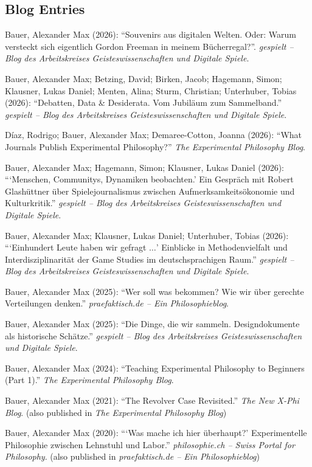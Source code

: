 \documentclass[a4paper,10pt]{article}
\newenvironment{literature}{%
   \parskip6pt\parindent0pt\raggedright
   \def\lititem{\hangindent=1cm\hangafter1}}{%
   \par\ignorespaces}
\begin{document}
\subsection*{Blog Entries}
\begin{literature}
\lititem Bauer, Alexander Max (2026): \enquote{Souvenirs aus digitalen Welten. Oder: Warum versteckt sich eigentlich Gordon Freeman in meinem Bücherregal?}. \textit{gespielt -- Blog des Arbeitskreises Geisteswissenschaften und Digitale Spiele}.

\lititem Bauer, Alexander Max; Betzing, David; Birken, Jacob; Hagemann, Simon; Klausner, Lukas Daniel; Menten, Alina; Sturm, Christian; Unterhuber, Tobias (2026): \enquote{Debatten, Data \& Desiderata. Vom Jubiläum zum Sammelband.} \textit{gespielt -- Blog des Arbeitskreises Geisteswissenschaften und Digitale Spiele}.

\lititem Díaz, Rodrigo; Bauer, Alexander Max; Demaree-Cotton, Joanna (2026): \enquote{What Journals Publish Experimental Philosophy?} \textit{The Experimental Philosophy Blog}.

\lititem Bauer, Alexander Max; Hagemann, Simon; Klausner, Lukas Daniel (2026): \enquote{\enquote{Menschen, Communitys, Dynamiken beobachten.} Ein Gespräch mit Robert Glashüttner über Spielejournalismus zwischen Aufmerksamkeitsökonomie und Kulturkritik.} \textit{gespielt -- Blog des Arbeitskreises Geisteswissenschaften und Digitale Spiele}.

\lititem Bauer, Alexander Max; Klausner, Lukas Daniel; Unterhuber, Tobias (2026): \enquote{\enquote{Einhundert Leute haben wir gefragt $\ldots$} Einblicke in Methodenvielfalt und Interdisziplinarität der Game Studies im deutschsprachigen Raum.} \textit{gespielt -- Blog des Arbeitskreises Geisteswissenschaften und Digitale Spiele}.

\lititem Bauer, Alexander Max (2025): \enquote{Wer soll was bekommen? Wie wir über gerechte Verteilungen denken.} \textit{praefaktisch.de -- Ein Philosophieblog}.

\lititem Bauer, Alexander Max (2025): \enquote{Die Dinge, die wir sammeln. Designdokumente als historische Schätze.} \textit{gespielt -- Blog des Arbeitskreises Geisteswissenschaften und Digitale Spiele}.

\lititem Bauer, Alexander Max (2024): \enquote{Teaching Experimental Philosophy to Beginners (Part 1).} \textit{The Experimental Philosophy Blog}.

\lititem Bauer, Alexander Max (2021): \enquote{The Revolver Case Revisited.} \textit{The New X-Phi Blog}. (also published in \textit{The Experimental Philosophy Blog})

\lititem Bauer, Alexander Max (2020): \enquote{\enquote{Was mache ich hier überhaupt?} Experimentelle Philosophie zwischen Lehnstuhl und Labor.} \textit{philosophie.ch -- Swiss Portal for Philosophy}. (also published in \textit{praefaktisch.de -- Ein Philosophieblog})
\end{literature}
\end{document}
